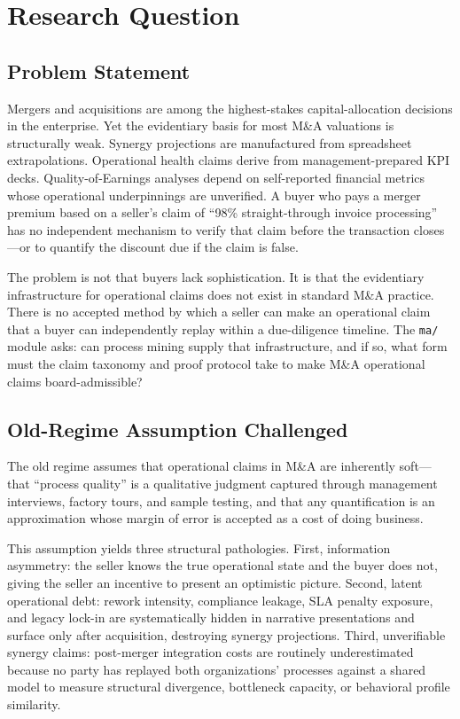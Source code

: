 
\section{Research Question}
\label{sec:ma-research-question}

\subsection{Problem Statement}
\label{sec:ma-rq-problem}

Mergers and acquisitions are among the highest-stakes capital-allocation decisions in the
enterprise. Yet the evidentiary basis for most M\&A valuations is structurally weak. Synergy
projections are manufactured from spreadsheet extrapolations. Operational health claims derive
from management-prepared KPI decks. Quality-of-Earnings analyses depend on self-reported
financial metrics whose operational underpinnings are unverified. A buyer who pays a merger
premium based on a seller's claim of ``98\% straight-through invoice processing'' has no
independent mechanism to verify that claim before the transaction closes---or to quantify
the discount due if the claim is false.

The problem is not that buyers lack sophistication. It is that the evidentiary
infrastructure for operational claims does not exist in standard M\&A practice. There is no
accepted method by which a seller can make an operational claim that a buyer can
independently replay within a due-diligence timeline. The \texttt{ma/} module asks: can
process mining supply that infrastructure, and if so, what form must the claim taxonomy and
proof protocol take to make M\&A operational claims board-admissible?

\subsection{Old-Regime Assumption Challenged}
\label{sec:ma-rq-old-regime}

The old regime assumes that operational claims in M\&A are inherently soft---that ``process
quality'' is a qualitative judgment captured through management interviews, factory tours, and
sample testing, and that any quantification is an approximation whose margin of error is
accepted as a cost of doing business.

This assumption yields three structural pathologies. First, information asymmetry: the seller
knows the true operational state and the buyer does not, giving the seller an incentive to
present an optimistic picture. Second, latent operational debt: rework intensity, compliance
leakage, SLA penalty exposure, and legacy lock-in are systematically hidden in narrative
presentations and surface only after acquisition, destroying synergy projections. Third,
unverifiable synergy claims: post-merger integration costs are routinely underestimated because
no party has replayed both organizations' processes against a shared model to measure
structural divergence, bottleneck capacity, or behavioral profile similarity.

